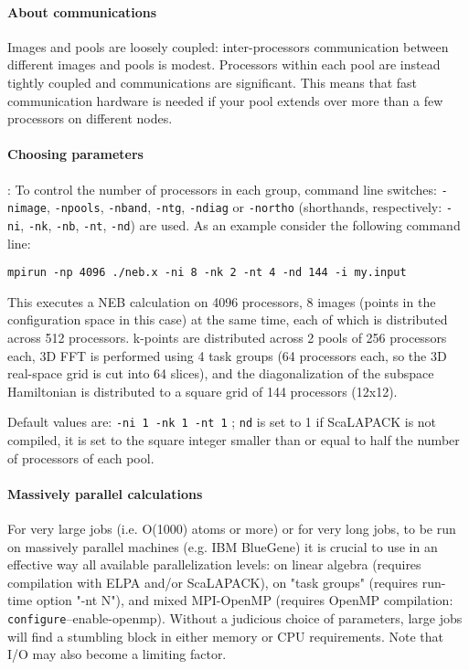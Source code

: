 \documentclass[12pt,a4paper]{article}
\def\configure{\texttt{configure}}
\begin{document}
\paragraph{About communications}
Images and pools are loosely coupled: inter-processors communication
between different images and pools is modest. Processors within each 
pool are instead tightly coupled and communications are significant. 
This means that fast communication hardware is needed if
your pool extends over more than a few processors on different nodes.

\paragraph{Choosing parameters}:
To control the number of processors in each group,
command line switches:
\texttt{-nimage}, \texttt{-npools}, \texttt{-nband},
\texttt{-ntg}, \texttt{-ndiag} or \texttt{-northo}
(shorthands, respectively: \texttt{-ni}, \texttt{-nk}, \texttt{-nb},
\texttt{-nt}, \texttt{-nd})
are used.
As an example consider the following command line:
\begin{verbatim}
mpirun -np 4096 ./neb.x -ni 8 -nk 2 -nt 4 -nd 144 -i my.input
\end{verbatim}
This executes a NEB calculation on 4096 processors, 8 images (points in the configuration
space in this case) at the same time, each of
which is distributed across 512 processors.
k-points are distributed across 2 pools of 256 processors each,
3D FFT is performed using 4 task groups (64 processors each, so
the 3D real-space grid is cut into 64 slices), and the diagonalization
of the subspace Hamiltonian is distributed to a square grid of 144
processors (12x12).

Default values are: \texttt{-ni 1 -nk 1 -nt 1} ;
\texttt{nd} is set to 1 if ScaLAPACK is not compiled,
it is set to the square integer smaller than or equal to  half the number
of processors of each pool.

\paragraph{Massively parallel calculations}
For very large jobs (i.e. O(1000) atoms or more) or for very long jobs,
to be run on massively parallel  machines (e.g. IBM BlueGene) it is
crucial to use in an effective way all available parallelization levels:
on linear algebra (requires compilation with ELPA and/or ScaLAPACK), 
on "task groups" (requires run-time option "-nt N"), and mixed
MPI-OpenMP (requires OpenMP compilation: \configure --enable-openmp).
Without a judicious choice of parameters, large jobs will find a
stumbling block in either memory or CPU requirements. Note that I/O
may also become a limiting factor.
\end{document}
